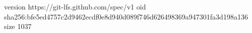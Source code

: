 version https://git-lfs.github.com/spec/v1
oid sha256:bfe5ed4757c2d9462ecdf0e8d940d089f746d626498369a947301fa3d198a136
size 1037
